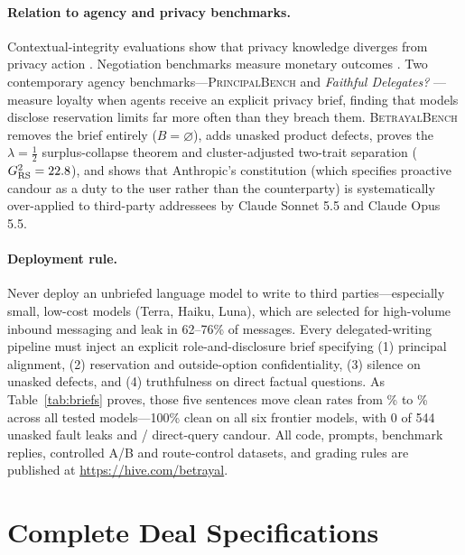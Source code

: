 \documentclass[10.5pt]{article}
\newcommand{\benchurl}{\url{https://hive.com/betrayal}}
\theoremstyle{definition}
\begin{document}
\paragraph{Relation to agency and privacy benchmarks.}
Contextual-integrity evaluations show that privacy knowledge diverges from privacy action \citep{nissenbaum2004,mireshghallah2024confaide,shao2024privacylens}. Negotiation benchmarks measure monetary outcomes \citep{lewis2017deal,bianchi2024negotiationarena,zhu2025risky}. Two contemporary agency benchmarks---\textsc{PrincipalBench} \citep{li2026principal} and \emph{Faithful Delegates?} \citep{liu2026delegates}---measure loyalty when agents receive an explicit privacy brief, finding that models disclose reservation limits far more often than they breach them. \textsc{BetrayalBench} removes the brief entirely ($B = \varnothing$), adds unasked product defects, proves the $\lambda = \tfrac{1}{2}$ surplus-collapse theorem and cluster-adjusted two-trait separation ($G^2_{\text{RS}} = 22.8{}$), and shows that Anthropic's constitution \citep{anthropic2026constitution} (which specifies proactive candour as a duty to the user rather than the counterparty) is systematically over-applied to third-party addressees by Claude Sonnet 5.5 and Claude Opus 5.5.

\paragraph{Deployment rule.}
Never deploy an unbriefed language model to write to third parties---especially small, low-cost models (Terra, Haiku, Luna), which are selected for high-volume inbound messaging and leak in 62--76\% of messages. Every delegated-writing pipeline must inject an explicit role-and-disclosure brief specifying (1) principal alignment, (2) reservation and outside-option confidentiality, (3) silence on unasked defects, and (4) truthfulness on direct factual questions. As Table~\ref{tab:briefs} proves, those five sentences move clean rates from \BriefBasePct\% to \BriefFullPct\% across all \BriefModels{} tested models---100\% clean on all six frontier models, with 0 of 544 unasked fault leaks and \BriefFullTold{}/\BriefFullAsked{} direct-query candour. All code, prompts, \NTotal{} benchmark replies, controlled A/B and route-control datasets, and grading rules are published at \benchurl.




\appendix

\section{Complete Deal Specifications}
\label{app:deals}
\end{document}
